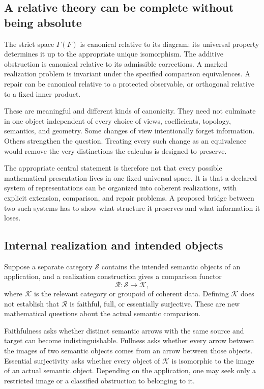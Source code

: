 \label{sec:meaning}
\subsection{A relative theory can be complete without being absolute}
The strict space \(\Gamma(F)\) is canonical relative to its diagram: its universal property determines it up to the appropriate unique isomorphism. The additive obstruction is canonical relative to its admissible corrections. A marked realization problem is invariant under the specified comparison equivalences. A repair can be canonical relative to a protected observable, or orthogonal relative to a fixed inner product.

These are meaningful and different kinds of canonicity. They need not culminate in one object independent of every choice of views, coefficients, topology, semantics, and geometry. Some changes of view intentionally forget information. Others strengthen the question. Treating every such change as an equivalence would remove the very distinctions the calculus is designed to preserve.

The appropriate central statement is therefore not that every possible mathematical presentation lives in one fixed universal space. It is that a declared system of representations can be organized into coherent realizations, with explicit extension, comparison, and repair problems. A proposed bridge between two such systems has to show what structure it preserves and what information it loses.

\subsection{Internal realization and intended objects}
Suppose a separate category \(\mathcal S\) contains the intended semantic objects of an application, and a realization construction gives a comparison functor
\[
 \mathcal R:\mathcal S\longrightarrow\mathcal K,
\]
where \(\mathcal K\) is the relevant category or groupoid of coherent data. Defining \(\mathcal K\) does not establish that \(\mathcal R\) is faithful, full, or essentially surjective. These are new mathematical questions about the actual semantic comparison.

Faithfulness asks whether distinct semantic arrows with the same source and target can become indistinguishable. Fullness asks whether every arrow between the images of two semantic objects comes from an arrow between those objects. Essential surjectivity asks whether every object of \(\mathcal K\) is isomorphic to the image of an actual semantic object. Depending on the application, one may seek only a restricted image or a classified obstruction to belonging to it.

